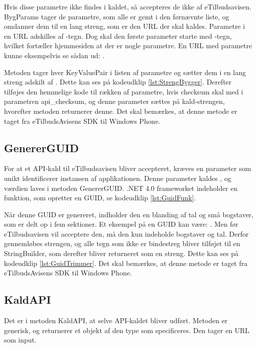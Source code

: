 Hvis disse parametre ikke findes i kaldet, så accepteres de ikke af eTilbudsavisen.
BygParams tager de parametre, som alle er gemt i den førnævnte liste, og omdanner dem til en lang streng, som er den URL der skal kaldes. Parametre i en URL adskilles af \gaas{\&}-tegn. Dog skal den første parameter starte med -tegn, hvilket fortæller hjemmesiden at der er nogle parametre. En URL med parametre kunne eksempelvis se sådan ud: .


Metoden tager hver KeyValuePair i listen af parametre og sætter dem i en lang streng adskilt af \gaas{\&}. Dette kan ses på kodeudklip \ref{lst:StrengBygger}.
Derefter tilføjes den hemmelige kode til rækken af parametre, hvis checksum skal med i parametren api\_checksum, og denne parameter sættes på kald-strengen, hvorefter metoden returnerer denne. Det skal bemærkes, at denne metode er taget fra eTilbudsAvisens SDK til Windows Phone.

\subsection{GenererGUID}
For at et API-kald til eTilbudsavisen bliver accepteret, kræves en parameter som unikt identificerer instansen af applikationen. Denne parameter kaldes , og værdien laves i metoden GenererGUID. .NET 4.0 frameworket indeholder en funktion, som opretter en GUID, se kodeudklip \ref{lst:GuidFunk}.


Når denne GUID er genereret, indholder den en blanding af tal og små bogstaver, som er delt op i fem sektioner. Et eksempel på en GUID kan være: . Men før eTilbudsavisen vil acceptere den, må den kun indeholde bogstaver og tal. Derfor gennemløbes strengen, og alle tegn som ikke er bindestreg bliver tilføjet til en StringBuilder, som derefter bliver returneret som en streng. Dette kan ses på kodeudklip \ref{lst:GuidTrimmer}. Det skal bemærkes, at denne metode er taget fra eTilbudsAvisens SDK til Windows Phone. 


\subsection{KaldAPI}
Det er i metoden KaldAPI, at selve API-kaldet bliver udført. Metoden er generisk, og returnerer et objekt af den type som specificeres. Den tager en URL som input.

